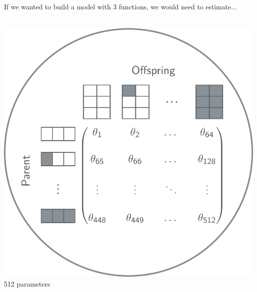 \documentclass[aspectratio=169, 9pt]{beamer}
\begin{document}
\begin{frame}[c,label=aphylo-ergm-example]
	
	\Large If we wanted to build a model with 3 functions, we would need to estimate...\large
	\\\bigskip
	
	\begin{minipage}[t]{.40\linewidth}
		\centering
		\\\bigskip
		\includegraphics[width=.8\linewidth]{aphylo-ergm-eq1.png} \\
			\vfill 512 parameters
	\end{minipage}\hfill
	\begin{minipage}[t]{.19\linewidth}
		\centering 
\end{minipage}
\end{frame}
\end{document}

